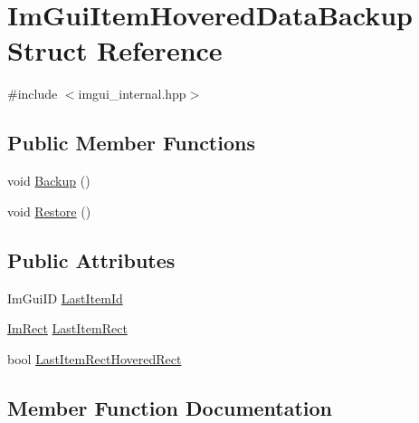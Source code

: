 \hypertarget{struct_im_gui_item_hovered_data_backup}{}\section{Im\+Gui\+Item\+Hovered\+Data\+Backup Struct Reference}
\label{struct_im_gui_item_hovered_data_backup}


{\ttfamily \#include $<$imgui\+\_\+internal.\+hpp$>$}

\subsection*{Public Member Functions}
\begin{DoxyCompactItemize}
\item 
void \hyperlink{struct_im_gui_item_hovered_data_backup_a2084500d9cbc9455e52fbe87c95f2315}{Backup} ()
\item 
void \hyperlink{struct_im_gui_item_hovered_data_backup_a4d807799df14f74bde55482134b076cc}{Restore} ()
\end{DoxyCompactItemize}
\subsection*{Public Attributes}
\begin{DoxyCompactItemize}
\item 
Im\+Gui\+ID \hyperlink{struct_im_gui_item_hovered_data_backup_a5e0b18013d983269deba7976666fc501}{Last\+Item\+Id}
\item 
\hyperlink{struct_im_rect}{Im\+Rect} \hyperlink{struct_im_gui_item_hovered_data_backup_ae489c222bed561950104a46ddf1387f3}{Last\+Item\+Rect}
\item 
bool \hyperlink{struct_im_gui_item_hovered_data_backup_a48dd47c573d5299de25be908d77f23f0}{Last\+Item\+Rect\+Hovered\+Rect}
\end{DoxyCompactItemize}


\subsection{Member Function Documentation}
\hypertarget{struct_im_gui_item_hovered_data_backup_a2084500d9cbc9455e52fbe87c95f2315}{}\label{struct_im_gui_item_hovered_data_backup_a2084500d9cbc9455e52fbe87c95f2315} 
